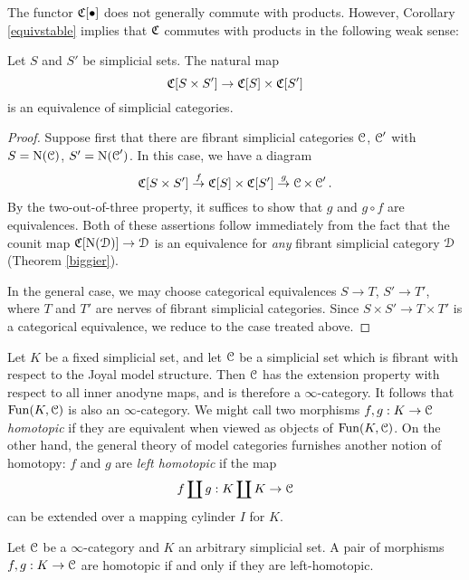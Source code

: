 The functor $\operatorname{\mathfrak{C}}[\bullet]$ does not generally commute with products.
However, Corollary \ref{equivstable} implies that $\operatorname{\mathfrak{C}}$ commutes with products in the following weak sense:

\begin{corollary}\label{prodcom}
Let $S$ and $S'$ be simplicial sets. The natural map
$$\operatorname{\mathfrak{C}}[S \times S'] \rightarrow \operatorname{\mathfrak{C}}[S] \times
\operatorname{\mathfrak{C}}[S']$$ is an equivalence of simplicial categories.
\end{corollary}

\begin{proof}
Suppose first that there are fibrant simplicial categories
$\operatorname{\mathcal{C}}$, $\operatorname{\mathcal{C}}'$ with $S = \operatorname{N}(\operatorname{\mathcal{C}})$, $S' =
\operatorname{N}(\operatorname{\mathcal{C}}')$. In this case, we have a diagram
$$ \operatorname{\mathfrak{C}}[S \times S'] \stackrel{f}{\rightarrow} \operatorname{\mathfrak{C}}[S] \times
\operatorname{\mathfrak{C}}[S'] \stackrel{g}{\rightarrow} \operatorname{\mathcal{C}} \times \operatorname{\mathcal{C}}'.$$
By the two-out-of-three property, it suffices to show that $g$ and
$g \circ f$ are equivalences. Both of these assertions follow
immediately from the fact that the counit map
$\operatorname{\mathfrak{C}}[\operatorname{N}(\operatorname{\mathcal{D}})] \rightarrow \operatorname{\mathcal{D}}$ is an equivalence for
{\em any} fibrant simplicial category $\operatorname{\mathcal{D}}$ (Theorem \ref{biggier}).

In the general case, we may choose categorical equivalences $S
\rightarrow T$, $S' \rightarrow T'$, where $T$ and $T'$ are nerves of fibrant simplicial categories. Since $S \times S'
\rightarrow T \times T'$ is a categorical equivalence, we reduce
to the case treated above.
\end{proof}

Let $K$ be a fixed simplicial set, and let $\operatorname{\mathcal{C}}$ be a simplicial set which is fibrant with respect to the Joyal model structure. 
Then $\operatorname{\mathcal{C}}$ has the extension property with respect to all inner anodyne maps, and is therefore a
$\infty$-category. It follows that $\operatorname{Fun}(K,\operatorname{\mathcal{C}})$ is also an $\infty$-category.
We might call two morphisms $f,g: K
\rightarrow \operatorname{\mathcal{C}}$ {\it homotopic} if they are equivalent when viewed
as objects of $\operatorname{Fun}(K,\operatorname{\mathcal{C}})$. On the other hand, the general
theory of model categories furnishes another notion of homotopy:
$f$ and $g$ are {\it left homotopic} if the map
$$ f \coprod g: K \coprod K \rightarrow \operatorname{\mathcal{C}}$$
can be extended over a mapping cylinder $I$ for $K$.

\begin{proposition}\label{fruity!}
Let $\operatorname{\mathcal{C}}$ be a $\infty$-category and $K$ an arbitrary simplicial set. A pair of morphisms $f,g: K \rightarrow \operatorname{\mathcal{C}}$ are homotopic if and only if they are left-homotopic.
\end{proposition}

